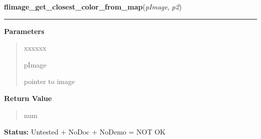 \hspace{.8\funcindent}\begin{boxedminipage}{\funcwidth}

    \raggedright \textbf{flimage\_get\_closest\_color\_from\_map}(\textit{pImage}, \textit{p2})

    \vspace{-1.5ex}

    \rule{\textwidth}{0.5\fboxrule}
\setlength{\parskip}{2ex}
\setlength{\parskip}{1ex}
      \textbf{Parameters}
      \vspace{-1ex}

      \begin{quote}
        \begin{Ventry}{xxxxxx}

          \item[pImage]

          pointer to image

        \end{Ventry}

      \end{quote}

      \textbf{Return Value}
    \vspace{-1ex}

      \begin{quote}
      num

      \end{quote}

\textbf{Status:} Untested + NoDoc + NoDemo = NOT OK



    \end{boxedminipage}

    \label{xformslib:library:flimage_get_linearlut}

    \vspace{0.5ex}

